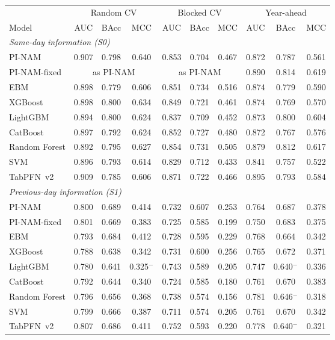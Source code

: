 \begin{tabular}{lccccccccc}
\toprule
 & \multicolumn{3}{c}{Random CV} & \multicolumn{3}{c}{Blocked CV} & \multicolumn{3}{c}{Year-ahead} \\
\cmidrule(lr){2-4}\cmidrule(lr){5-7}\cmidrule(lr){8-10}
Model & AUC & BAcc & MCC & AUC & BAcc & MCC & AUC & BAcc & MCC \\
\midrule
\multicolumn{10}{l}{\textit{Same-day information (S0)}} \\
PI-NAM & 0.907 & 0.798 & 0.640 & 0.853 & 0.704 & 0.467 & 0.872 & 0.787 & 0.561 \\
PI-NAM-fixed & \multicolumn{3}{c}{as PI-NAM} & \multicolumn{3}{c}{as PI-NAM} & 0.890 & 0.814 & 0.619 \\
EBM & 0.898 & 0.779 & 0.606 & 0.851 & 0.734 & 0.516 & 0.874 & 0.779 & 0.590 \\
XGBoost & 0.898 & 0.800 & 0.634 & 0.849 & 0.721 & 0.461 & 0.874 & 0.769 & 0.570 \\
LightGBM & 0.894 & 0.800 & 0.624 & 0.837 & 0.709 & 0.452 & 0.873 & 0.800 & 0.604 \\
CatBoost & 0.897 & 0.792 & 0.624 & 0.852 & 0.727 & 0.480 & 0.872 & 0.767 & 0.576 \\
Random Forest & 0.892 & 0.795 & 0.627 & 0.854 & 0.731 & 0.505 & 0.879 & 0.812 & 0.617 \\
SVM & 0.896 & 0.793 & 0.614 & 0.829 & 0.712 & 0.433 & 0.841 & 0.757 & 0.522 \\
TabPFN~v2 & 0.909 & 0.785 & 0.606 & 0.871 & 0.722 & 0.466 & 0.895 & 0.793 & 0.584 \\
\midrule
\multicolumn{10}{l}{\textit{Previous-day information (S1)}} \\
PI-NAM & 0.800 & 0.689 & 0.414 & 0.732 & 0.607 & 0.253 & 0.764 & 0.687 & 0.378 \\
PI-NAM-fixed & 0.801 & 0.669 & 0.383 & 0.725 & 0.585 & 0.199 & 0.750 & 0.683 & 0.375 \\
EBM & 0.793 & 0.684 & 0.412 & 0.728 & 0.595 & 0.229 & 0.768 & 0.664 & 0.342 \\
XGBoost & 0.788 & 0.638 & 0.342 & 0.731 & 0.600 & 0.256 & 0.765 & 0.672 & 0.371 \\
LightGBM & 0.780 & 0.641 & 0.325$^{-}$ & 0.743 & 0.589 & 0.205 & 0.747 & 0.640$^{-}$ & 0.336 \\
CatBoost & 0.792 & 0.644 & 0.340 & 0.724 & 0.585 & 0.180 & 0.761 & 0.670 & 0.383 \\
Random Forest & 0.796 & 0.656 & 0.368 & 0.738 & 0.574 & 0.156 & 0.781 & 0.646$^{-}$ & 0.318 \\
SVM & 0.799 & 0.666 & 0.387 & 0.711 & 0.574 & 0.205 & 0.761 & 0.670 & 0.342 \\
TabPFN~v2 & 0.807 & 0.686 & 0.411 & 0.752 & 0.593 & 0.220 & 0.778 & 0.640$^{-}$ & 0.321 \\
\bottomrule
\end{tabular}
